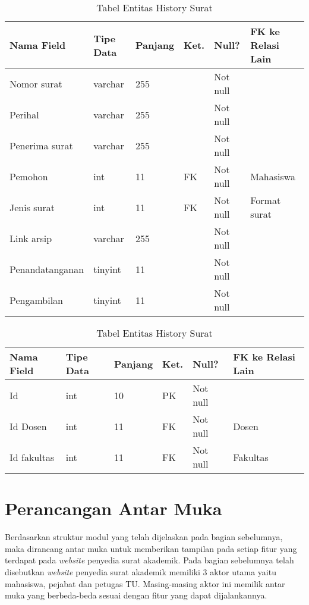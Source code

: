\begin{table}[H]
\centering
\caption{Tabel Entitas History Surat}
\label{entitas_history_surat}
\begin{tabular}{|l|l|l|l|l|l|}
\hline
\textbf{Nama Field}&\textbf{Tipe Data}&\textbf{Panjang}&\textbf{Ket.}&\textbf{Null?}&\textbf{FK ke Relasi Lain}\\ \hline
Nomor surat&varchar&255&&Not null&\\ \hline
Perihal&varchar&255&&Not null&\\ \hline
Penerima surat&varchar&255&&Not null&\\ \hline
Pemohon&int&11&FK&Not null&Mahasiswa\\ \hline
Jenis surat&int&11&FK&Not null&Format surat\\ \hline
Link arsip&varchar&255&&Not null&\\ \hline
Penandatanganan&tinyint&11&&Not null&\\ \hline
Pengambilan&tinyint&11&&Not null&\\ \hline
\end{tabular}
\end{table}

\begin{table}[H]
\centering
\caption{Tabel Entitas History Surat}
\label{entitas_history_surat}
\begin{tabular}{|l|l|l|l|l|l|}
\hline
\textbf{Nama Field}&\textbf{Tipe Data}&\textbf{Panjang}&\textbf{Ket.}&\textbf{Null?}&\textbf{FK ke Relasi Lain}\\ \hline
Id&int&10&PK&Not null&\\ \hline
Id Dosen&int&11&FK&Not null&Dosen\\ \hline
Id fakultas&int&11&FK&Not null&Fakultas\\ \hline
\end{tabular}
\end{table}

\section{Perancangan Antar Muka}
\label{sec:perancangan_antar_muka}
Berdasarkan struktur modul yang telah dijelaskan pada bagian sebelumnya, maka dirancang antar muka untuk memberikan tampilan pada setiap fitur yang terdapat pada \textit{website} penyedia surat akademik. Pada bagian sebelumnya telah disebutkan \textit{website} penyedia surat akademik memiliki 3 aktor utama yaitu mahasiswa, pejabat dan petugas TU. Masing-masing aktor ini memilik antar muka yang berbeda-beda sesuai dengan fitur yang dapat dijalankannya.

